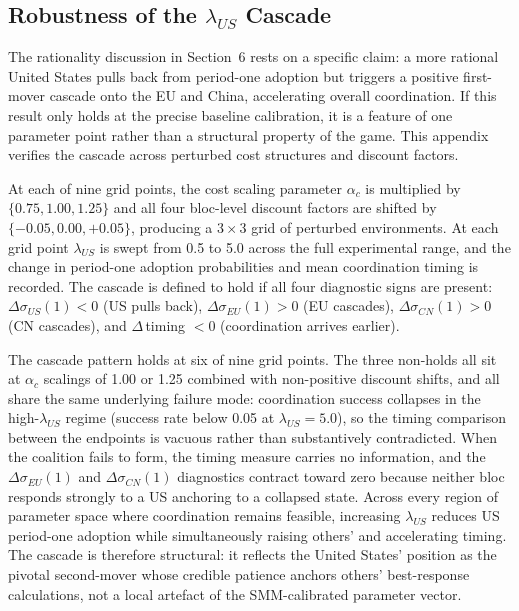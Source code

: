 \documentclass[10pt,a4paper]{article}
\begin{document}
\clearpage
\needspace{12em}
\subsection{Robustness of the $\lambda_{US}$ Cascade}

The rationality discussion in Section~6 rests on a specific claim: a more rational United States pulls back from period-one adoption but triggers a positive first-mover cascade onto the EU and China, accelerating overall coordination. If this result only holds at the precise baseline calibration, it is a feature of one parameter point rather than a structural property of the game. This appendix verifies the cascade across perturbed cost structures and discount factors.

At each of nine grid points, the cost scaling parameter $\alpha_c$ is multiplied by $\{0.75, 1.00, 1.25\}$ and all four bloc-level discount factors are shifted by $\{-0.05, 0.00, +0.05\}$, producing a $3 \times 3$ grid of perturbed environments. At each grid point $\lambda_{US}$ is swept from 0.5 to 5.0 across the full experimental range, and the change in period-one adoption probabilities and mean coordination timing is recorded. The cascade is defined to hold if all four diagnostic signs are present: $\Delta\sigma_{US}(1) < 0$ (US pulls back), $\Delta\sigma_{EU}(1) > 0$ (EU cascades), $\Delta\sigma_{CN}(1) > 0$ (CN cascades), and $\Delta$\,timing $< 0$ (coordination arrives earlier).

\FloatBarrier

\FloatBarrier

The cascade pattern holds at six of nine grid points. The three non-holds all sit at $\alpha_c$ scalings of 1.00 or 1.25 combined with non-positive discount shifts, and all share the same underlying failure mode: coordination success collapses in the high-$\lambda_{US}$ regime (success rate below 0.05 at $\lambda_{US}=5.0$), so the timing comparison between the endpoints is vacuous rather than substantively contradicted. When the coalition fails to form, the timing measure carries no information, and the $\Delta\sigma_{EU}(1)$ and $\Delta\sigma_{CN}(1)$ diagnostics contract toward zero because neither bloc responds strongly to a US anchoring to a collapsed state. Across every region of parameter space where coordination remains feasible, increasing $\lambda_{US}$ reduces US period-one adoption while simultaneously raising others' and accelerating timing. The cascade is therefore structural: it reflects the United States' position as the pivotal second-mover whose credible patience anchors others' best-response calculations, not a local artefact of the SMM-calibrated parameter vector.
\end{document}
